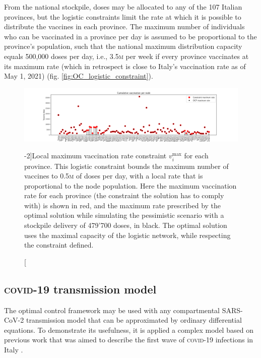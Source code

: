From the national stockpile, doses may be allocated to any of the 107 Italian provinces, but the logistic constraints limit the rate at which it is possible to distribute the vaccines in each province. The maximum number of individuals who can be vaccinated in a province per day is assumed to be proportional to the province's population, such that the national maximum distribution capacity equals 500,000 doses per day, i.e., 3.5\textsc{m} per week if every province vaccinates at its maximum rate (which in retrospect is close to Italy's vaccination rate as of May 1, 2021) (fig. \ref{fig:OC_logistic_constraint}). 

\begin{figure}[!ht]
    \centering
    \includegraphics{fig_italy-ocp/figuresSI/SI_constraint_dist.pdf}
    \caption[Vizualisation of the local maximum vaccination rate constraint][-2\baselineskip]{Local maximum vaccination rate constraint $v_i^\mathrm{max}$ for each province. This logistic constraint bounds the maximum number of vaccines to 0.5\textsc{m} of doses per day, with a local rate that is proportional to the node population. Here the maximum vaccination rate for each province (the constraint the solution has to comply with) is shown in red, and the maximum rate prescribed by the optimal solution while simulating the pessimistic scenario with a stockpile delivery of 479'700 doses, in black. The optimal solution uses the maximal capacity of the logistic network, while respecting the constraint defined.}
    \label{fig:OC_logistic_constraints}
\end{figure}


\subsection{\textsc{covid}-19 transmission model} 
The optimal control framework may be used with any compartmental SARS-CoV-2 transmission model that can be approximated by ordinary differential equations. To demonstrate its usefulness, it is applied a complex model based on previous work that was aimed to describe the first wave of \textsc{covid}-19 infections in Italy \parencite{Gatto:SpreadDynamicsCOVID19:2020,Bertuzzo:GeographyCOVID19Spread:2020}. 

